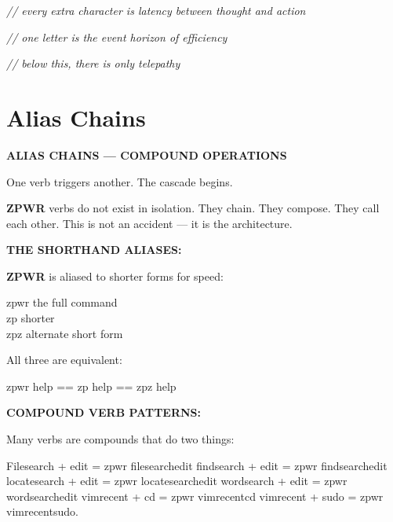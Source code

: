 \documentclass[11pt,a4paper,twoside]{book}
\begin{document}
{\small\itshape\color{dimtext} // every extra character is latency between thought and action}

{\small\itshape\color{dimtext} // one letter is the event horizon of efficiency}

{\small\itshape\color{dimtext} // below this, there is only telepathy}


\vspace{16pt}

\section{Alias Chains}


\vspace{10pt}
{\large\bfseries\color{neoncyan} ALIAS CHAINS — COMPOUND OPERATIONS}\vspace{6pt}

One verb triggers another. The cascade begins.

\textbf{ZPWR} verbs do not exist in isolation. They chain. They compose. They call each other. This is not an accident — it is the architecture.


\vspace{12pt}
{\bfseries\color{neonyellow} THE SHORTHAND ALIASES:}\vspace{4pt}

\textbf{ZPWR} is aliased to shorter forms for speed:

\begin{codebox}
\color{neongreen}zpwr   the full command\\
\color{neongreen}zp     shorter\\
\color{neongreen}zpz    alternate short form\\
\end{codebox}

All three are equivalent:

\begin{codebox}
\color{neongreen}zpwr help  ==  zp help  ==  zpz help\\
\end{codebox}


\vspace{12pt}
{\bfseries\color{neonyellow} COMPOUND VERB PATTERNS:}\vspace{4pt}

Many verbs are compounds that do two things:

Filesearch + edit     = zpwr filesearchedit findsearch + edit     = zpwr findsearchedit locatesearch + edit   = zpwr locatesearchedit wordsearch + edit     = zpwr wordsearchedit vimrecent + cd        = zpwr vimrecentcd vimrecent + sudo      = zpwr vimrecentsudo.
\end{document}
